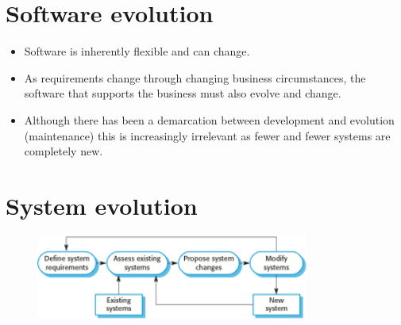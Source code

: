 \section{Software evolution}
\begin{itemize}

\item Software is inherently flexible and can change.

\item As requirements change through changing business circumstances, the software that supports the business must also evolve and change.

\item Although there has been a demarcation between development and evolution (maintenance) this is increasingly irrelevant as fewer and fewer systems are completely new.
\end{itemize}

\newpage
\section{System evolution}
\begin{figure}[h!]
    \centering
    \includegraphics[width = 0.8\textwidth]{./figures/systemevolution_L1_8.png}
    \caption{}
    \label{fig:L1_8}
\end{figure}

